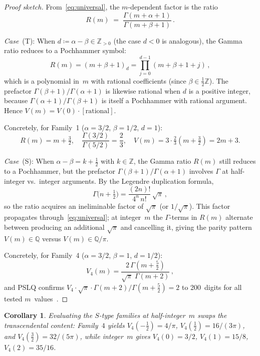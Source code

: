 \documentclass[11pt,a4paper]{article}
\newtheorem{corollary}[theorem]{Corollary}
\theoremstyle{definition}
\theoremstyle{remark}
\begin{document}
\begin{proof}[Proof sketch]
From~\eqref{eq:universal}, the $m$-dependent factor is the ratio
\[
  R(m) \;=\; \frac{\Gamma(m + \alpha + 1)}{\Gamma(m + \beta + 1)}\,.
\]

\emph{Case}~(T): When $d \coloneqq \alpha - \beta \in \mathbb{Z}_{>0}$
(the case $d < 0$ is analogous), the Gamma ratio reduces to a
Pochhammer symbol:
\[
  R(m) = (m + \beta + 1)_d
       = \prod_{j=0}^{d-1}(m + \beta + 1 + j)\,,
\]
which is a polynomial in~$m$ with rational coefficients
(since $\beta \in \tfrac{1}{2}\mathbb{Z}$).
The prefactor $\Gamma(\beta+1)/\Gamma(\alpha+1)$ is likewise rational
when $d$ is a positive integer, because $\Gamma(\alpha+1)/\Gamma(\beta+1)$
is itself a Pochhammer with rational argument.
Hence $V(m) = V(0) \cdot [\text{rational}]$.

Concretely, for Family~1 ($\alpha = 3/2$, $\beta = 1/2$, $d=1$):
\[
  R(m) = m + \tfrac{3}{2}, \quad
  \frac{\Gamma(3/2)}{\Gamma(5/2)} = \frac{2}{3}, \quad
  V(m) = 3 \cdot \tfrac{2}{3}(m + \tfrac{3}{2}) = 2m + 3.
\]

\emph{Case}~(S): When $\alpha - \beta = k + \tfrac{1}{2}$
with $k \in \mathbb{Z}$, the Gamma ratio $R(m)$ still reduces to a
Pochhammer, but the prefactor
$\Gamma(\beta+1)/\Gamma(\alpha+1)$ involves
$\Gamma$ at half-integer vs.\ integer arguments.
By the Legendre duplication formula,
\[
  \Gamma\bigl(n + \tfrac{1}{2}\bigr) = \frac{(2n)!}{4^n\,n!}\,\sqrt\pi\,,
\]
so the ratio acquires an ineliminable factor of $\sqrt\pi$ (or $1/\sqrt\pi$).
This factor propagates through~\eqref{eq:universal};
at integer~$m$ the $\Gamma$-terms in $R(m)$ alternate between producing an
additional $\sqrt\pi$ and cancelling it, giving the parity pattern
$V(m) \in \mathbb{Q}$ versus $V(m) \in \mathbb{Q}/\pi$.

Concretely, for Family~4 ($\alpha = 3/2$, $\beta = 1$, $d = 1/2$):
\[
  V_4(m) = \frac{2\,\Gamma(m+\tfrac{5}{2})}{\sqrt\pi\;\Gamma(m+2)}\,,
\]
and PSLQ confirms $V_4 \cdot \sqrt\pi \cdot \Gamma(m+2)/\Gamma(m+\tfrac{5}{2}) = 2$
to 200~digits for all tested $m$~values~\cite{ferguson1999pslq}.
\end{proof}

\begin{corollary}\label{cor:half-int-m}
Evaluating the $S$-type families at half-integer~$m$ swaps
the transcendental content:
Family~$4$ yields $V_4(-\tfrac{1}{2}) = 4/\pi$,
$V_4(\tfrac{1}{2}) = 16/(3\pi)$, and
$V_4(\tfrac{3}{2}) = 32/(5\pi)$,
while integer~$m$ gives $V_4(0) = 3/2$, $V_4(1) = 15/8$, $V_4(2) = 35/16$.
\end{corollary}
\end{document}
